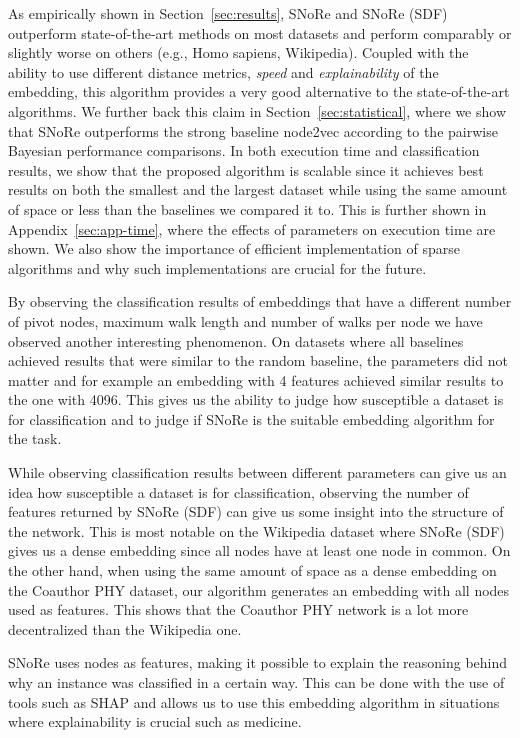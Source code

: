 \documentclass[twoside,11pt]{article}
\begin{document}
As empirically shown in Section~\ref{sec:results}, SNoRe and SNoRe (SDF) outperform state-of-the-art methods on most datasets and perform comparably or slightly worse on others (e.g., Homo sapiens, Wikipedia). Coupled with the ability to use different distance metrics, \emph{speed} and \emph{explainability} of the embedding, this algorithm provides a very good alternative to the state-of-the-art algorithms. We further back this claim in Section~\ref{sec:statistical}, where we show that SNoRe outperforms the strong baseline node2vec according to the pairwise Bayesian performance comparisons.
In both execution time and classification results, we show that the proposed algorithm is scalable since it achieves best results on both the smallest and the largest dataset while using the same amount of space or less than the baselines we compared it to. This is further shown in Appendix~\ref{sec:app-time}, where the effects of parameters on execution time are shown. We also show the importance of efficient implementation of sparse algorithms and why such implementations are crucial for the future.

By observing the classification results of embeddings that have a different number of pivot nodes, maximum walk length and number of walks per node we have observed another interesting phenomenon. On datasets where all baselines achieved results that were similar to the random baseline, the parameters did not matter and for example an embedding with 4 features achieved similar results to the one with 4096. This gives us the ability to judge how susceptible a dataset is for classification and to judge if SNoRe is the suitable embedding algorithm for the task. 

While observing classification results between different parameters can give us an idea how susceptible a dataset is for classification, observing the number of features returned by SNoRe (SDF) can give us some insight into the structure of the network. This is most notable on the Wikipedia dataset where SNoRe (SDF) gives us a dense embedding since all nodes have at least one node in common. On the other hand, when using the same amount of space as a dense embedding on the Coauthor PHY dataset, our algorithm generates an embedding with all nodes used as features. This shows that the Coauthor PHY network is a lot more decentralized than the Wikipedia one.

SNoRe uses nodes as features, making it possible to explain the reasoning behind why an instance was classified in a certain way. This can be done with the use of tools such as SHAP and allows us to use this embedding algorithm in situations where explainability is crucial such as medicine.
\end{document}
